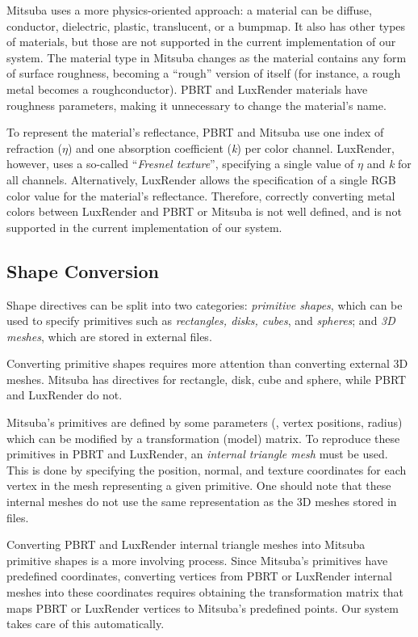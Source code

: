 Mitsuba uses a more physics-oriented approach: a material can be diffuse, conductor, dielectric, plastic, translucent, or a bumpmap. It also has other types of materials, but those are not supported in the current implementation of our system. The material type in Mitsuba changes as the material contains any form of surface roughness, becoming a ``rough'' version of itself (for instance, a rough metal becomes a roughconductor). PBRT and LuxRender materials have roughness parameters, making it unnecessary to change the material's name.

To represent the material's reflectance, PBRT and Mitsuba use one index of refraction ($\eta$) and one absorption coefficient (\textit{k}) per color channel. 
LuxRender, however, uses a so-called ``{\it Fresnel texture}'', specifying a single value of $\eta$ and \textit{k} for all channels. Alternatively, LuxRender allows the specification of a single RGB color value for the material's reflectance. Therefore, correctly converting metal colors between LuxRender and PBRT or Mitsuba is not well defined, and is not supported in the current implementation of our system.

\subsection{Shape Conversion}
Shape directives can be split into two categories: {\it primitive shapes}, which can be used to specify primitives such as {\it rectangles, disks, cubes}, and {\it spheres}; and {\it 3D meshes}, which are stored in external files. 

Converting primitive shapes requires more attention than converting external 3D meshes. Mitsuba has directives for rectangle, disk, cube and sphere, while PBRT and LuxRender do not. 

Mitsuba's primitives are defined by some parameters (\eg, vertex positions, radius) which can be modified by a transformation (model) matrix. To reproduce these primitives in PBRT and LuxRender, an {\it internal triangle mesh} must be used. This is done by specifying the position, normal, and texture coordinates for each vertex in the mesh representing a given primitive. One should note that these internal meshes do not use the same representation as the 3D meshes stored in files.

Converting PBRT and LuxRender internal triangle meshes into Mitsuba primitive shapes is a more involving process. Since Mitsuba's primitives have predefined coordinates, converting vertices from PBRT or LuxRender internal meshes into these coordinates requires obtaining the transformation matrix that maps PBRT or LuxRender vertices to Mitsuba's predefined points. Our system takes care of this automatically.

